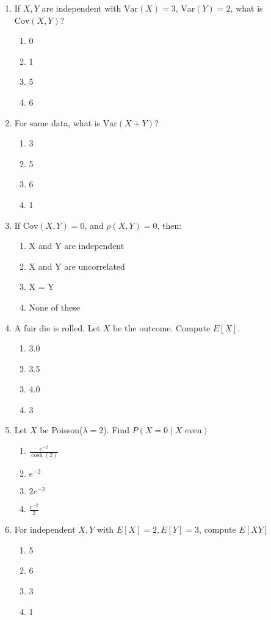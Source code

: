 \begin{enumerate}
\item If \(X, Y\) are independent with \(\text{Var}(X) = 3\), \(\text{Var}(Y) = 2\), what is \(\text{Cov}(X, Y)\)?

\begin{enumerate}[label=(\alph*)]
\item 0 \quad \item 1 \quad \item 5 \quad \item 6
\end{enumerate}

\item For same data, what is \(\text{Var}(X + Y)\)?

\begin{enumerate}[label=(\alph*)]
\item 3 \quad \item 5 \quad \item 6 \quad \item 1
\end{enumerate}

\item If \(\text{Cov}(X,Y) = 0\), and \(\rho(X,Y) = 0\), then:

\begin{enumerate}[label=(\alph*)]
\item X and Y are independent
\item X and Y are uncorrelated
\item X = Y
\item None of these
\end{enumerate}

\item A fair die is rolled. Let \(X\) be the outcome. Compute \(E[X]\).

\begin{enumerate}[label=(\alph*)]
\item 3.0 \quad \item 3.5 \quad \item 4.0 \quad \item 3
\end{enumerate}

\item Let \(X\) be Poisson(\(\lambda = 2\)). Find \(P(X = 0 \mid X \text{ even})\)

\begin{enumerate}[label=(\alph*)]
\item \(\frac{e^{-2}}{\cosh(2)}\) \quad \item \(e^{-2}\) \quad \item \(2e^{-2}\) \quad \item \(\frac{e^{-2}}{2}\)
\end{enumerate}

\item For independent \(X,Y\) with \(E[X]=2, E[Y]=3\), compute \(E[XY]\)

\begin{enumerate}[label=(\alph*)]
\item 5 \quad \item 6 \quad \item 3 \quad \item 1
\end{enumerate}

\end{enumerate}
